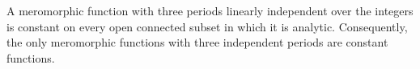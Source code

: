 A meromorphic function with three periods linearly independent over the integers is constant on every open connected subset in which it is analytic. Consequently, the only meromorphic functions with three independent periods are constant functions.
